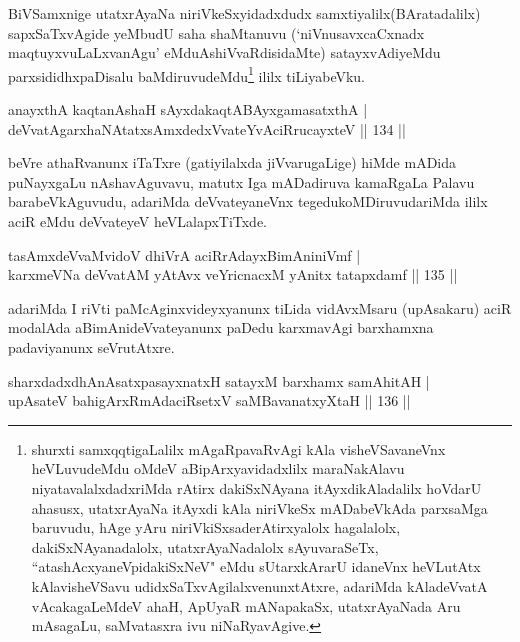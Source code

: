 \begin{artha}
BiVSamxnige utatxrAyaNa niriVkeSxyidadxdudx samxtiyalilx(BAratadalilx) sapxSaTxvAgide yeMbudU saha shaMtanuvu (`niVnusavxcaCxnadx maqtuyxvuLaLxvanAgu' eMdu\break AshiVvaRdisidaMte) satayxvAdiyeMdu parxsididhxpaDisalu baMdiruvudeMdu\footnote{shurxti  samxqqtigaLalilx mAgaRpavaRvAgi kAla visheVSavaneVnx heVLuvudeMdu oMdeV  aBipArxyavidadxlilx maraNakAlavu niyatavalalxdadxriMda rAtirx dakiSxNAyana itAyxdikAladalilx hoVdarU ahasusx, utatxrAyaNa itAyxdi  kAla niriVkeSx mADabeVkAda parxsaMga baruvudu, hAge yAru  niriVkiSxsade\break rAtirxyalolx hagalalolx, dakiSxNAyanadalolx,  utatxrAyaNadalolx sAyuvaraSeTx, ``atashAcxyaneV\s pidakiSxNeV" eMdu  sUtarxkArarU idaneVnx heVLutAtx kAlavisheVSavu  udidxSaTxvAgilalxvenunxtAtxre, adariMda kAladeVvatA vAcakagaLeMdeV  ahaH, ApUyaR mANapakaSx, utatxrAyaNada Aru mAsagaLu, saMvatasxra ivu  niNaRyavAgive.} ililx tiLiyabeVku.
\end{artha}

\begin{shl}
anayxthA kaqtanAshaH sAyxdakaqtABAyxgamasatxthA | \\
deVvatAgarxhaNAtatxsAmxdedxVvateYvAciRrucayxteV \hfill|| 134 || 
\end{shl}

\begin{artha}
beVre athaRvanunx iTaTxre (gatiyilalxda jiVvarugaLige) hiMde mADida
puNayxgaLu nAshavAguvavu, matutx Iga mADadiruva kamaRgaLa Palavu
barabeVkAguvudu, adariMda deVvateyaneVnx tegedukoMDiruvudariMda ililx
aciR eMdu deVvateyeV heVLalapxTiTxde.
\end{artha}


\begin{shl}
tasAmxdeVvaMvidoV dhiVrA aciRrAdayxBimAniniVmf | \\
karxmeVNa deVvatAM yAtAvx veYricnacxM yAnitx tatapxdamf \hfill|| 135 || 
\end{shl}

\begin{artha}
adariMda I riVti paMcAginxvideyxyanunx tiLida vidAvxMsaru (upAsakaru)
aciR modalAda aBimAnideVvateyanunx paDedu karxmavAgi barxhamxna
padaviyanunx seVrutAtxre.
\end{artha}


\begin{shl}
sharxdadxdhAnAsatxpasayxnatxH satayxM barxhamx samAhitAH | \\
upAsateV bahigArxRmAdaciRsetxV saMBavanatxyXtaH \hfill|| 136 || 
\end{shl}

